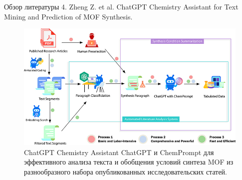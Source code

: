 \documentclass{beamer}
\begin{document}
	\begin{frame}{Обзор литературы}
		{\scriptsize4. Zheng Z. et al. ChatGPT Chemistry Assistant for Text Mining and Prediction of MOF Synthesis.}
		
\begin{figure}
	\centering
	\includegraphics[width=0.7\linewidth]{"images/Schematics of the ChatGPT Chemistry Assistant workflow"}
	\caption{ChatGPT Chemistry Assistant ChatGPT и ChemPrompt для эффективного анализа текста и обобщения условий синтеза MOF из разнообразного набора опубликованных исследовательских статей. }
	\label{fig:schematics-of-the-chatgpt-chemistry-assistant-workflow}
\end{figure}
	\end{frame}
	
\end{document}
